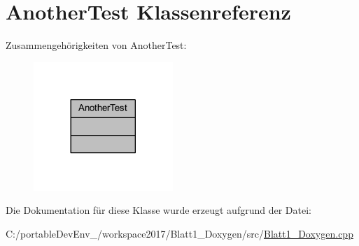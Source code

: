 \hypertarget{class_another_test}{}\section{Another\+Test Klassenreferenz}
\label{class_another_test}


Zusammengehörigkeiten von Another\+Test\+:\nopagebreak
\begin{figure}[H]
\begin{center}
\leavevmode
\includegraphics[width=149pt]{class_another_test__coll__graph}
\end{center}
\end{figure}


Die Dokumentation für diese Klasse wurde erzeugt aufgrund der Datei\+:\begin{DoxyCompactItemize}
\item 
C\+:/portable\+Dev\+Env\+\_/workspace2017/\+Blatt1\+\_\+\+Doxygen/src/\hyperlink{_blatt1___doxygen_8cpp}{Blatt1\+\_\+\+Doxygen.\+cpp}\end{DoxyCompactItemize}
